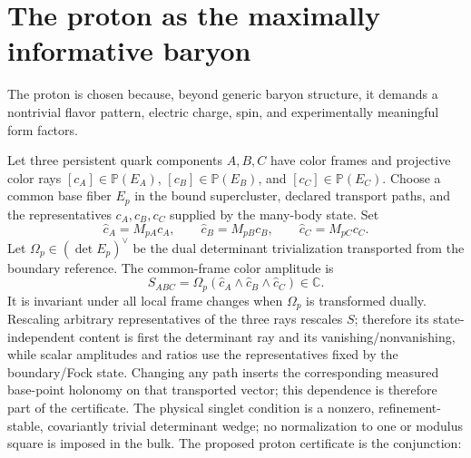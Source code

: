 \documentclass[11pt,letterpaper]{article}
\begin{document}
\section{The proton as the maximally informative baryon}\label{sec:proton}

The proton is chosen because, beyond generic baryon structure, it demands a
nontrivial flavor pattern, electric charge, spin, and experimentally meaningful
form factors.

Let three persistent quark components $A,B,C$ have color frames and projective
color rays $[c_A]\in\mathbb P(E_A)$,
$[c_B]\in\mathbb P(E_B)$, and $[c_C]\in\mathbb P(E_C)$. Choose a common base
fiber $E_p$ in the bound supercluster, declared transport paths, and the
representatives $c_A,c_B,c_C$ supplied by the many-body state. Set
\begin{equation*}
  \widehat c_A=M_{pA}c_A,\qquad
  \widehat c_B=M_{pB}c_B,\qquad
  \widehat c_C=M_{pC}c_C .
\end{equation*}
Let $\Omega_p\in(\det E_p)^\vee$ be the dual determinant trivialization
transported from the boundary reference. The common-frame color amplitude is
\begin{equation*}
  S_{ABC}
  =\Omega_p\!\left(
     \widehat c_A\wedge\widehat c_B\wedge\widehat c_C
   \right)\in\mathbb C .
\end{equation*}
It is invariant under all local frame changes when $\Omega_p$ is transformed
dually. Rescaling arbitrary representatives of the three rays rescales $S$;
therefore its state-independent content is first the determinant ray and its
vanishing/nonvanishing, while scalar amplitudes and ratios use the
representatives fixed by the boundary/Fock state. Changing any path inserts
the corresponding measured base-point holonomy on that transported vector;
this dependence is therefore part of the certificate. The physical singlet
condition is a nonzero,
refinement-stable, covariantly trivial determinant wedge; no normalization to
one or modulus square is imposed in the bulk.
The proposed proton certificate is the conjunction:
\end{document}
